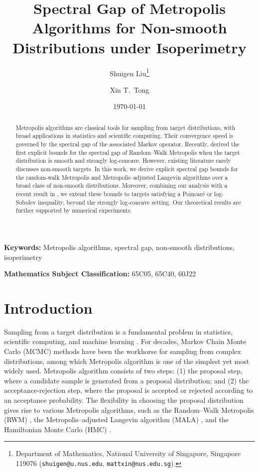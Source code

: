 \documentclass[11pt]{article}
\title{Spectral Gap of Metropolis Algorithms for Non-smooth Distributions under Isoperimetry}
\author{Shuigen Liu\thanks{Department of Mathematics, National University of Singapore, Singapore 119076 (\texttt{shuigen@u.nus.edu}, \texttt{mattxin@nus.edu.sg}).} \and Xin T.~Tong\footnotemark[1]}
\date{\today}
\begin{document}
\maketitle


\begin{abstract}
%
Metropolis algorithms are classical tools for sampling from target distributions, with broad applications in statistics and scientific computing.
%
Their convergence speed is governed by the spectral gap of the associated Markov operator.
Recently, \cite{24-AAP2058} derived the first explicit bounds for the spectral gap of Random--Walk Metropolis when the target distribution is smooth and strongly log-concave.
%
However, existing literature rarely discusses non-smooth targets.
In this work, we derive explicit spectral gap bounds for the random-walk Metropolis and Metropolis--adjusted Langevin algorithms over a broad class of non-smooth distributions.
%
Moreover, combining our analysis with a recent result in \cite{goyal2025mixing}, we extend these bounds to targets satisfying a Poincar\'e or log-Sobolev inequality, beyond the strongly log-concave setting.
%
Our theoretical results are further supported by numerical experiments.
\end{abstract}


\bigskip
\noindent\textbf{Keywords:} 
Metropolis algorithms, spectral gap, non-smooth distributions, isoperimetry

\bigskip
\noindent\textbf{Mathematics Subject Classification:} 65C05, 65C40, 60J22




\section{Introduction}
\label{sec:intro}

Sampling from a target distribution is a fundamental problem in statistics, scientific computing, and machine learning \citep{pmlr-v75-dwivedi18a,JMLR:v23:20-527,chewi2023logconcave}.
For decades, Markov Chain Monte Carlo (MCMC) methods \citep{MR2742422} have been the workhorse for sampling from complex distributions, among which Metropolis algorithm \citep{10.1063/1.1699114} is one of the simplest yet most widely used.
%
Metropolis algorithm consists of two steps:
(1) the proposal step, where a candidate sample is generated from a proposal distribution; and (2) the acceptance-rejection step, where the proposal is accepted or rejected according to an acceptance probability.
The flexibility in choosing the proposal distribution gives rise to various Metropolis algorithms, such as the Random--Walk Metropolis (RWM) \citep{MR1389882}, the Metropolis--adjusted Langevin algorithm (MALA) \citep{MR1440273}, and the Hamiltonian Monte Carlo (HMC) \citep{DUANE1987216}.
\end{document}
